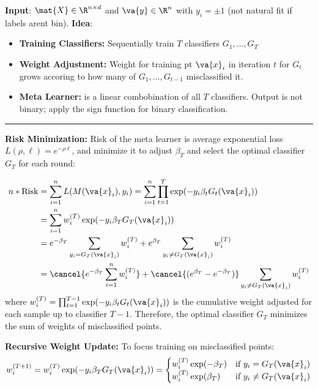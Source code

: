 \documentclass[10pt,landscape]{article}
\newcommand{\ruler}{\vspace{-0.4em}\noindent\rule{\linewidth}{0.25pt}\par}
\begin{document}
\begin{multicols*}{3}
    \textbf{Input}: $\mat{X} \in \R^{n \times d}$ and $\va{y} \in \R^n$ with $y_i = \pm 1$ (not natural fit if labels arent bin).
    \textbf{Idea}:
    \begin{itemize}
        \item \textbf{Training Classifiers:} Sequentially train $T$ classifiers $G_1, \dots, G_T$
        \item \textbf{Weight Adjustment:} Weight for training pt $\va{x}_i$ in iteration $t$ for $G_t$ grows accoring to how many of $G_1, \dots, G_{t - 1}$ misclassified it.
        \item \textbf{Meta Learner:} is a linear combobination of all $T$ classifiers. Output is not binary; apply the sign function for binary classification.
    \end{itemize}
    \ruler%
    \textbf{Risk Minimization:} Risk of the meta learner is average exponential loss $L(\rho, \ell) = e^{-\rho \ell}$, and minimize it to adjust $\beta_T$ and select the optimal classifier $G_T$ for each round:

    \begin{align*}
        n * \text{Risk} & = \sum_{i = 1}^{n} L(M(\va{x}_i), y_i)=\sum_{i = 1}^{n} \prod_{t = 1}^{T} \exp(-y_i \beta_t G_t(\va{x}_i))                         \\
                        & = \sum_{i = 1}^{n} w^{(T)}_i \exp(-y_i \beta_T G_T(\va{x}_i))                                                                      \\
                        & = e^{-\beta_T} \sum_{y_i = G_T(\va{x}_i)} w^{(T)}_i + e^{\beta_T}\sum_{y_i \neq G_T(\va{x}_i)} w^{(T)}_i                           \\
                        & = \cancel{e^{-\beta_T} \sum_{i = 1}^{n} w^{(T)}_i} + \cancel{(e^{\beta_T} - e^{-\beta_T})} \sum_{y_i \neq G_T(\va{x}_i)} w^{(T)}_i
    \end{align*}
    where \( w^{(T)}_i = \prod_{t = 1}^{T - 1} \exp(-y_i \beta_t G_t(\va{x}_i)) \) is the cumulative weight adjusted for each sample up to classifier \( T-1 \).
    Therefore, the optimal classifier $G_T$ minimizes the sum of weights of misclassified points.

    \textbf{Recursive Weight Update:}
    To focus training on misclassified points:
    \[
        w^{(T+1)}_i = w^{(T)}_i \exp(-y_i \beta_T G_T(\va{x}_i)) =
        \begin{cases}
            w^{(T)}_i \exp(-\beta_T) & \text{if } y_i = G_T(\va{x}_i)    \\
            w^{(T)}_i \exp(\beta_T)  & \text{if } y_i \neq G_T(\va{x}_i)
        \end{cases}
    \]


\end{multicols*}
\end{document}
